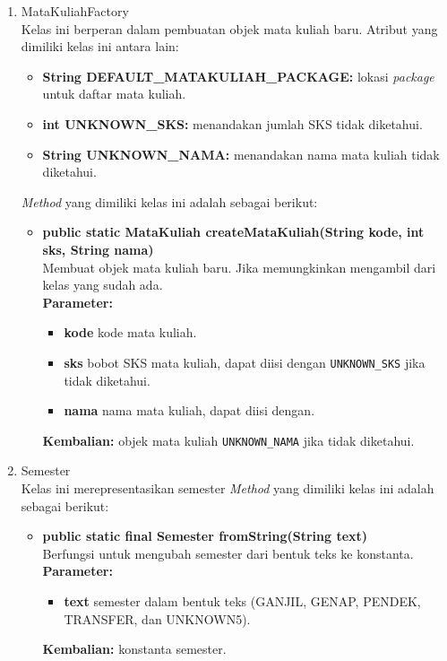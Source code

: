 \begin{enumerate}
\begin{enumerate}
		\item MataKuliahFactory\\
		Kelas ini berperan dalam pembuatan objek mata kuliah baru. Atribut yang dimiliki kelas ini antara lain:
		\begin{itemize}
			\item \textbf{String DEFAULT\_MATAKULIAH\_PACKAGE:} lokasi \textit{package} untuk daftar mata kuliah.
			\item \textbf{int UNKNOWN\_SKS:} menandakan jumlah SKS tidak diketahui.
			\item \textbf{String UNKNOWN\_NAMA:} menandakan nama mata kuliah tidak diketahui.
		\end{itemize}
		\textit{Method} yang dimiliki kelas ini adalah sebagai berikut:
		\begin{itemize}	
			\item \textbf{public static MataKuliah createMataKuliah(String kode, int sks, String nama)} \\
			Membuat objek mata kuliah baru. Jika memungkinkan mengambil dari kelas yang sudah ada.\\
			\textbf{Parameter:}
			\begin{itemize}
				\item \textbf{kode} kode mata kuliah.
				\item \textbf{sks} bobot SKS mata kuliah, dapat diisi dengan \texttt{UNKNOWN\_SKS} jika tidak diketahui.
				\item \textbf{nama} nama mata kuliah, dapat diisi dengan.
			\end{itemize}
			\textbf{Kembalian:} objek mata kuliah \texttt{UNKNOWN\_NAMA} jika tidak diketahui.
		\end{itemize}
		
		\item Semester\\
		Kelas ini merepresentasikan semester
		\textit{Method} yang dimiliki kelas ini adalah sebagai berikut:
		\begin{itemize}
			\item \textbf{public static final Semester fromString(String text)} \\
			Berfungsi untuk mengubah semester dari bentuk teks ke konstanta. \\
			\textbf{Parameter:}
			\begin{itemize}
				\item \textbf{text} semester dalam bentuk teks (GANJIL, GENAP, PENDEK, TRANSFER, dan UNKNOWN5).
			\end{itemize}
			\textbf{Kembalian:} konstanta semester.
		\end{itemize}
		

\end{enumerate}
\end{enumerate}
